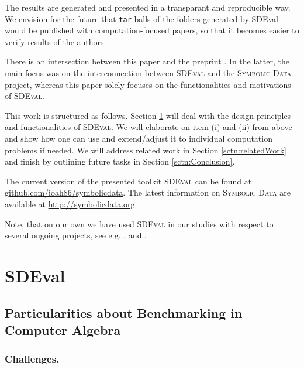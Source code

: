 \documentclass[12pt]{article}
\begin{document}
The results are generated and presented in a transparant and reproducible
way. We envision for the future that \texttt{tar}-balls of the folders
generated by SDEval would be published with computation-focused papers, so that
it becomes easier to verify results of the authors.

There is an intersection between this paper and the preprint
\cite{heinle2013symbolicdata}. In the latter, the main focus was on the
interconnection between \textsc{SDEval} and the \textsc{Symbolic Data} project,
whereas this paper solely focuses on the functionalities and motivations of
\textsc{SDEval}.

This work is structured as follows. Section \ref{sctn:SDEval} will deal with
the design principles and functionalities of \textsc{SDEval}. We will elaborate
on item (i) and (ii) from above and show how one can use and extend/adjust it
to individual computation problems if needed. We will address related work in
Section \ref{sctn:relatedWork} and finish by outlining future tasks in Section
\ref{sctn:Conclusion}.

The current version of the presented toolkit \textsc{SDEval} can be found at
\url{github.com/ioah86/symbolicdata}.  The latest information on
\textsc{Symbolic Data} are available at \url{http://symbolicdata.org}.

Note, that on our own we have used \textsc{SDEval} in our studies with respect
to several ongoing projects, see e.g. \cite{CCHLMSU11},
\cite{heinle2013factorization} and \cite{giesbrecht2014factoring}.

\section{SDEval}
\label{sctn:SDEval}

\subsection{Particularities about Benchmarking in Computer Algebra}

\subsubsection{Challenges.}
\end{document}
